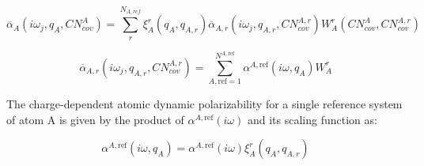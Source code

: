 \begin{equation}
  \overline{\alpha}_A(i\omega_j, q_A, CN_{cov}^A) = \sum_{r}^{N_{A,ref}} \xi_A^r (q_A, q_{A,r}) \overline{\alpha}_{A,r}(i\omega_j, q_{A,r}, CN_{cov}^{A,r}) W_A^r(CN_{cov}^A, CN_{cov}^{A,r})
\end{equation}

\begin{equation}
  \overline{\alpha}_{A,r}(i\omega_j, q_{A,r}, CN_{cov}^{A,r}) = \sum_{A,\text{ref}=1}^{N^{A,\text{ref}}} \alpha^{A,\text{ref}} (i\omega, q_A) W_A^r
\end{equation}

%
%

%
%

\noindent
The charge-dependent atomic dynamic polarizability for a single reference system of atom A is given by the product of \(\alpha^{A,\text{ref}}(i\omega)\) and its scaling function as:

\begin{equation}
  \alpha^{A,\text{ref}}(i\omega, q_A) = \alpha^{A,\text{ref}}(i\omega) \xi_A^r(q_A, q_{A,r})
\end{equation}



